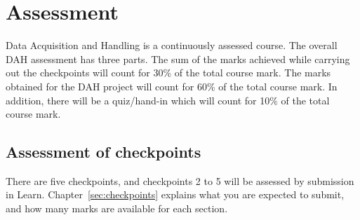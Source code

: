 \section{Assessment} 

Data Acquisition and Handling is a continuously assessed course.
The overall DAH assessment has three parts.
The sum of the marks achieved while carrying out the checkpoints will count for 30\% of the total course mark.
The marks obtained for the DAH project will count for 60\% of the total course mark.
In addition, there will be a quiz/hand-in which will count for 10\% of the total course mark.

\subsection{Assessment of checkpoints}

There are five checkpoints, and checkpoints 2 to 5 will be assessed by submission in Learn.
Chapter~\ref{sec:checkpoints} explains what you are expected to submit, and how many marks are available for each section.

